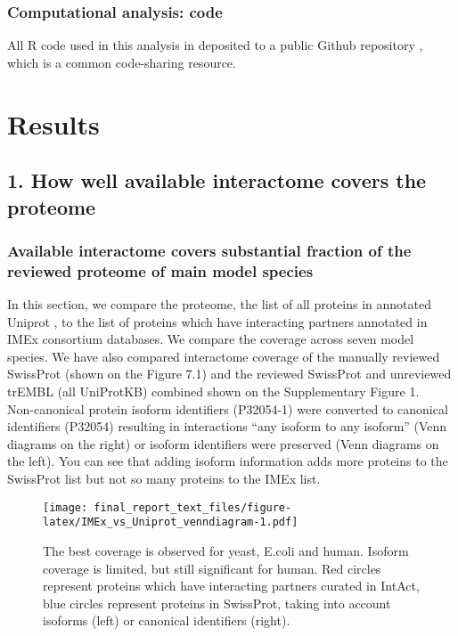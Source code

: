 \documentclass[12pt,]{report}
\begin{document}
\subsection{Computational analysis:
code}\label{computational-analysis-code}

All R code used in this analysis in deposited to a public Github
repository \citep{VKleshchevnikov2017}, which is a common code-sharing
resource.

\chapter{Results}\label{results}

\section{1. How well available interactome covers the
proteome}\label{how-well-available-interactome-covers-the-proteome}

\subsection{Available interactome covers substantial fraction of the
reviewed proteome of main model
species}\label{available-interactome-covers-substantial-fraction-of-the-reviewed-proteome-of-main-model-species}

In this section, we compare the proteome, the list of all proteins in
annotated Uniprot \citep{The-UniProt:2017aa}, to the list of proteins
which have interacting partners annotated in IMEx consortium databases.
We compare the coverage across seven model species. We have also
compared interactome coverage of the manually reviewed SwissProt (shown
on the Figure 7.1) and the reviewed SwissProt and unreviewed trEMBL (all
UniProtKB) combined shown on the Supplementary Figure 1.\\
Non-canonical protein isoform identifiers (P32054-1) were converted to
canonical identifiers (P32054) resulting in interactions ``any isoform
to any isoform'' (Venn diagrams on the right) or isoform identifiers
were preserved (Venn diagrams on the left). You can see that adding
isoform information adds more proteins to the SwissProt list but not so
many proteins to the IMEx list.

\begin{figure}
\centering
\texttt{[image: final\_report\_text\_files/figure-latex/IMEx\_vs\_Uniprot\_venndiagram-1.pdf]}
\caption{The best coverage is observed for yeast, E.coli and human.
Isoform coverage is limited, but still significant for human. Red
circles represent proteins which have interacting partners curated in
IntAct, blue circles represent proteins in SwissProt, taking into
account isoforms (left) or canonical identifiers (right).}
\end{figure}
\end{document}
